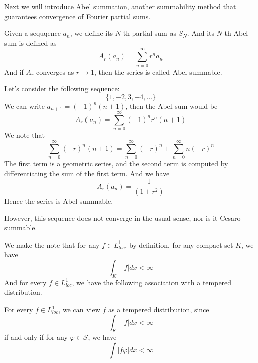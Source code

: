 Next we will introduce Abel summation, another summability method that guarantees convergence of Fourier partial sums.
\begin{definition}
    Given a sequqence $a_n$, we define its $N$-th partial sum as $S_N$. And its $N$-th Abel sum is defined as
    \begin{equation*}
        A_r(a_n)=\sum_{n=0}^\infty r^na_n
    \end{equation*}
    And if $A_r$ converges as $r\to 1$, then the series is called Abel summable.
\end{definition}
\begin{example}
    Let's consider the following sequence: 
    \begin{equation*}
        \{1, -2, 3, -4, ...\}
    \end{equation*}
    We can write $a_{n+1}=(-1)^n(n+1)$, then the Abel sum would be
    \begin{equation*}
        A_r(a_n)=\sum_{n=0}^\infty(-1)^nr^n(n+1)
    \end{equation*}
    We note that
    \begin{equation*}
        \sum_{n=0}^\infty(-r)^n(n+1)=\sum_{n=0}^\infty(-r)^n+\sum_{n=0}^\infty n(-r)^n
    \end{equation*}
    The first term is a geometric series, and the second term is computed by differentiating the sum of the first term. And we have
    \begin{equation*}
        A_r(a_n)=\frac{1}{(1+r^2)}
    \end{equation*}
    Hence the series is Abel summable.
\end{example}
However, this sequence does not converge in the usual sense, nor is it Cesaro summable.


We make the note that for any $f\in L_{loc}^1$, by definition, for any compact set $K$, we have
\begin{equation*}
    \int_K|f|dx<\infty
\end{equation*}
And for every $f\in L_{loc}^1$, we have the following association with a tempered distribution.
\begin{proposition}
    For every $f\in L_{loc}^1$, we can view $f$ as a tempered distribution, since
    \begin{equation*}
        \int_K|f|dx<\infty
    \end{equation*}
    if and only if for any $\varphi\in\mathcal{S}$, we have
    \begin{equation*}
        \int|f\varphi|dx<\infty
    \end{equation*}
\end{proposition}



